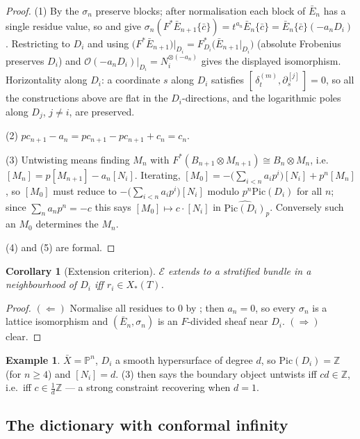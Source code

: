 \documentclass[11pt,reqno]{amsart}
\newcommand{\ZZ}{\mathbb{Z}}
\newcommand{\PP}{\mathbb{P}}
\newcommand{\cO}{\mathcal{O}}
\newcommand{\cE}{\mathcal{E}}
\newcommand{\Pic}{\mathrm{Pic}}
\newcommand{\Xst}{X_*(T)}
\theoremstyle{plain}
\newtheorem{corollary}[theorem]{Corollary}
\theoremstyle{definition}
\newtheorem{example}[theorem]{Example}
\theoremstyle{remark}
\numberwithin{equation}{section}
\begin{document}
\begin{proof}
(1) By  the $\sigma_n$ preserve blocks; after
normalisation each block of $\bar E_n$ has a single residue value, so
 and  give
$\sigma_n(F^*\bar E_{n+1}\{\bar c\})=t^{a_n}\bar E_n\{\bar c\}
=\bar E_n\{\bar c\}(-a_nD_i)$.  Restricting to $D_i$ and using
$\bigl(F^*\bar E_{n+1}\bigr)\big|_{D_i}=F_{D_i}^*\bigl(\bar E_{n+1}|_{D_i}\bigr)$
(absolute Frobenius preserves $D_i$) and
$\cO(-a_nD_i)|_{D_i}=N_i^{\otimes(-a_n)}$ gives the displayed isomorphism.
Horizontality along $D_i$: a coordinate $s$ along $D_i$ satisfies
$[\,\delta^{(m)}_t,\partial_s^{[j]}\,]=0$, so all the constructions above
are flat in the $D_i$-directions, and the logarithmic poles along
$D_j$, $j\ne i$, are preserved.

(2) $pc_{n+1}-a_n=pc_{n+1}-pc_{n+1}+c_n=c_n$.

(3) Untwisting means finding $M_n$ with $F^*(B_{n+1}\otimes M_{n+1})\cong
B_n\otimes M_n$, i.e.\ $[M_n]=p[M_{n+1}]-a_n[N_i]$.  Iterating,
$[M_0]=-\bigl(\sum_{i<n}a_ip^i\bigr)[N_i]+p^n[M_n]$, so $[M_0]$ must
reduce to $-\bigl(\sum_{i<n}a_ip^i\bigr)[N_i]$ modulo $p^n\Pic(D_i)$ for
all $n$; since $\sum_na_np^n=-c$ this says $[M_0]\mapsto c\cdot[N_i]$ in
$\widehat{\Pic(D_i)}_p$.  Conversely such an $M_0$ determines the $M_n$.

(4) and (5) are formal.
\end{proof}

\begin{corollary}[Extension criterion]\label{cor:extension}
$\cE$ extends to a stratified bundle in a neighbourhood of $D_i$ iff
$r_i\in\Xst$.
\end{corollary}
\begin{proof}
$(\Leftarrow)$ Normalise all residues to $0$ by ; then
$a_n=0$, so every $\sigma_n$ is a lattice isomorphism and
$(\bar E_n,\sigma_n)$ is an $F$-divided sheaf near $D_i$.  $(\Rightarrow)$
clear.
\end{proof}

\begin{example}
$\bar X=\PP^n$, $D_i$ a smooth hypersurface of degree $d$, so
$\Pic(D_i)=\ZZ$ (for $n\ge4$) and $[N_i]=d$.  (3) then
says the boundary object untwists iff $cd\in\ZZ$, i.e.\ iff
$c\in\frac1d\ZZ$ --- a strong constraint recovering
 when $d=1$.
\end{example}

\subsection{The dictionary with conformal infinity}\label{sec:conformal}
\end{document}
